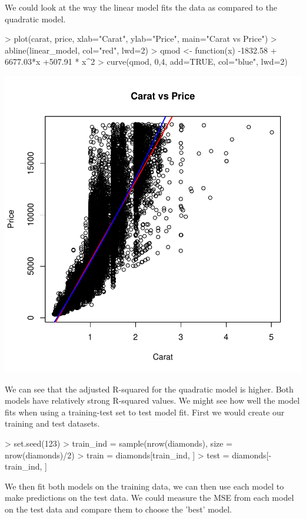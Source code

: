 \documentclass{article}
\begin{document}
We could look at the way the linear model fits the data as compared to the quadratic model.

\begin{Schunk}
\begin{Sinput}
> plot(carat, price, xlab="Carat", ylab="Price", main="Carat vs Price")
> abline(linear_model, col="red", lwd=2)
> qmod <- function(x) -1832.58 + 6677.03*x +507.91 * x^2 
> curve(qmod, 0,4, add=TRUE, col="blue", lwd=2) 
\end{Sinput}
\end{Schunk}
\includegraphics{Lab2-chunk}


We can see that the adjusted R-squared for the quadratic model is higher.  Both models have relatively strong R-squared values.  We might see how well the model fits when using a training-test set to test model fit.  First we would create our training and test datasets.

\begin{Schunk}
\begin{Sinput}
> set.seed(123)
> train_ind = sample(nrow(diamonds), size = nrow(diamonds)/2)
> train = diamonds[train_ind, ]
> test = diamonds[-train_ind, ]
\end{Sinput}
\end{Schunk}

We then fit both models on the training data, we can then use each model to make predictions on the test data.  We could measure the MSE from each model on the test data and compare them to choose the 'best' model.
\end{document}
